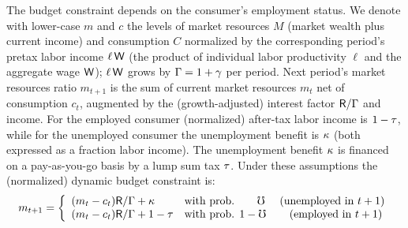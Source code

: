 \documentclass[titlepage]{\econtex}
\begin{document}
 The budget constraint depends on the consumer's employment status. We denote  with lower-case $m$ and $c$ the levels of market resources $M$ (market wealth plus current income) and consumption $C$ normalized by the corresponding period's pretax labor income $\ell\,\mathsf{W}$ (the product of individual labor productivity $\ell$ and the aggregate wage $\mathsf{W}$); $\ell\,\mathsf{W}$ grows by $\Gamma=1+\gamma$ per period.  Next period's market resources ratio $m_{t+1}$ is the sum of current market resources $m_{t}$ net of consumption $c_t$, augmented by the (growth-adjusted) interest factor $\mathsf{R}/\Gamma$ and income. For the employed consumer (normalized) after-tax labor income is $1-\tau$, while for the unemployed consumer the unemployment benefit is $\kappa$ (both expressed as a fraction labor income). The unemployment benefit $\kappa$ is financed on a pay-as-you-go basis by a lump sum tax $\tau$.  Under these assumptions the (normalized) dynamic budget constraint is:
\begin{equation}
    m_{t+1}=\left\{
    \begin{array}{ll}
    (m_{t}-c_t)\mathsf{R}/\Gamma+\kappa & \mbox{with prob. }\phantom{1-~}\mho \quad \text{          (unemployed in $t+1$)}\\
    (m_{t}-c_t)\mathsf{R}/\Gamma+1-\tau  & \mbox{with prob. }1-\mho           \quad \text{\phantom{un}(employed in $t+1$)}
    \end{array}
  \right. \label{eq:dbc}
\end{equation} %
\end{document}
